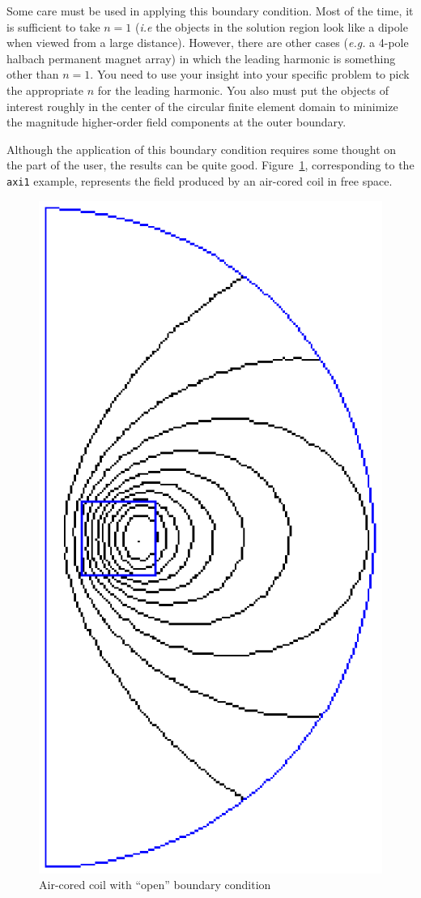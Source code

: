 \documentclass[12pt]{report}
\begin{document}
Some care must be used in applying this boundary condition.  Most
of the time, it is sufficient to take $n=1$ ({\em i.e} the objects
in the solution region look like a dipole when viewed from a large
distance). However, there are other cases ({\em e.g.} a 4-pole
halbach permanent magnet array) in which the leading harmonic is
something other than $n=1$. You need to use your insight into your
specific problem to pick the appropriate $n$ for the leading
harmonic.  You also must put the objects of interest roughly in the
center of the circular finite element domain to minimize the
magnitude higher-order field components at the outer boundary.

Although the application of this boundary condition requires some
thought on the part of the user, the results can be quite good.
Figure~\ref{ax1_fig}, corresponding to the {\tt axi1} example,
represents the field produced by an air-cored coil in free space.
\begin{figure}
\centerline{\includegraphics{ax1.ps}}
\caption{Air-cored coil with ``open'' boundary condition}
\label{ax1_fig}
\end{figure}
\end{document}

